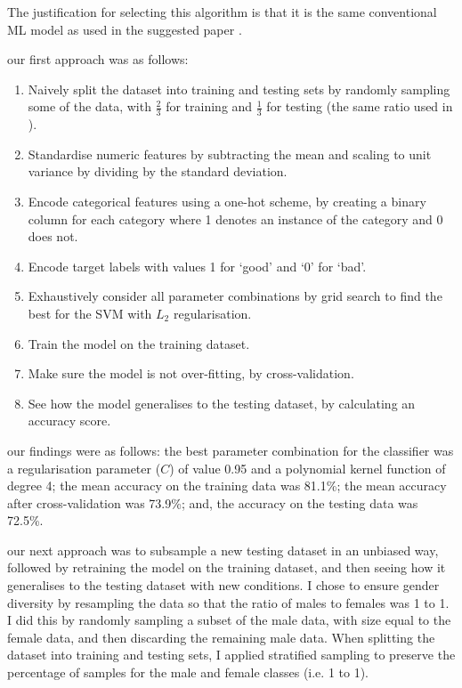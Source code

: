 \documentclass[conference]{IEEEtran}
\begin{document}
The justification for selecting this algorithm is that it is the same conventional ML model as used in the suggested paper \cite{Feldman2015ComputationalFP}.

our first approach was as follows:
\begin{enumerate}
    \item Naively split the dataset into training and testing sets by randomly sampling some of the data, with $\frac{2}{3}$ for training and $\frac{1}{3}$ for testing (the same ratio used in \cite{Feldman2015ComputationalFP}).
    \item Standardise numeric features by subtracting the mean and scaling to unit variance by dividing by the standard deviation.
    \item Encode categorical features using a one-hot scheme, by creating a binary column for each category where 1 denotes an instance of the category and 0 does not. 
    \item Encode target labels with values 1 for `good' and `0' for `bad'. 
    \item Exhaustively consider all parameter combinations by grid search to find the best for the SVM with $L_2$ regularisation. 
    \item Train the model on the training dataset.
    \item Make sure the model is not over-fitting, by cross-validation.
    \item See how the model generalises to the testing dataset, by calculating an accuracy score. 
\end{enumerate}

our findings were as follows: the best parameter combination for the classifier was a regularisation parameter ($C$) of value 0.95 and a polynomial kernel function of degree 4; the mean accuracy on the training data was 81.1\%; the mean accuracy after cross-validation was 73.9\%; and, the accuracy on the testing data was 72.5\%.   

our next approach was to subsample a new testing dataset in an unbiased way, followed by retraining the model on the training dataset, and then seeing how it generalises to the testing dataset with new conditions. I chose to ensure gender diversity by resampling the data so that the ratio of males to females was 1 to 1. I did this by randomly sampling a subset of the male data, with size equal to the female data, and then discarding the remaining male data. When splitting the dataset into training and testing sets, I applied stratified sampling to preserve the percentage of samples for the male and female classes (i.e. 1 to 1).
\end{document}

